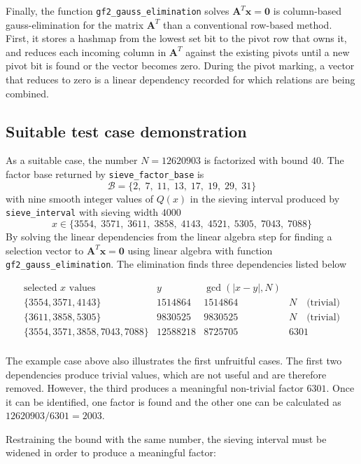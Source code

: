 \documentclass[11pt,a4paper]{article}
\begin{document}
Finally, the function \texttt{gf2\_gauss\_elimination} solves $\textbf{A}^T\textbf{x} = \textbf{0}$ is column-based gauss-elimination for the matrix $\textbf{A}^T$ than a conventional row-based method. First, it stores a hashmap from the lowest set bit to the pivot row that owns it, and reduces each incoming column in $\textbf{A}^T$ against the existing pivots until a new pivot bit is found or the vector becomes zero. During the pivot marking, a vector that reduces to zero is a linear dependency recorded for which relations are being combined.

\subsection*{Suitable test case demonstration}

As a suitable case, the number $N = 12620903$ is factorized with bound $40$. The factor base returned by \texttt{sieve\_factor\_base} is
\[
\mathcal{B}=\{2,\;7,\;11,\;13,\;17,\;19,\;29,\;31\}
\]
with nine smooth integer values of $Q(x)$ in the sieving interval produced by \texttt{sieve\_interval} with sieving width $4000$
\[
x \in \{3554,\;3571,\;3611,\;3858,\;4143,\;4521,\;5305,\;7043,\;7088\}
\]
By solving the linear dependencies from the linear algebra step for finding a selection vector to $\textbf{A}^T\textbf{x} = \textbf{0}$ using linear algebra with function \texttt{gf2\_gauss\_elimination}. The elimination finds three dependencies listed below

\[
\begin{array}{l|r|r|l}
\text{selected }x \text{ values} & y & \gcd(|x-y|,N) \\ \hline
\{3554, 3571, 4143\} & 1514864 & 1514864 & N \quad \text{(trivial)} \\
\{3611, 3858, 5305\} & 9830525 & 9830525 & N \quad \text{(trivial)} \\
\{3554, 3571, 3858, 7043, 7088\} & 12588218 & 8725705 & 6301 \\
\end{array}
\]

The example case above also illustrates the first unfruitful cases. The first two dependencies produce trivial values, which are not useful and are therefore removed. However, the third produces a meaningful non-trivial factor $6301$. Once it can be identified, one factor is found and the other one can be calculated as $12620903/6301 = 2003$.

Restraining the bound with the same number, the sieving interval must be widened in order to produce a meaningful factor:
\end{document}
